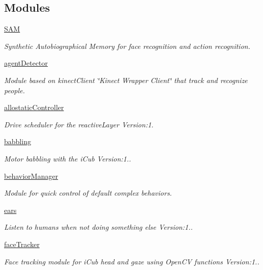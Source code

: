 \subsection*{Modules}
\begin{DoxyCompactItemize}
\item 
\hyperlink{group__icubclient__SAM__source}{S\+AM}
\begin{DoxyCompactList}\small\item\em Synthetic Autobiographical Memory for face recognition and action recognition. \end{DoxyCompactList}\item 
\hyperlink{group__agentDetector}{agent\+Detector}
\begin{DoxyCompactList}\small\item\em Module based on kinect\+Client \char`\"{}\+Kinect Wrapper Client\char`\"{} that track and recognize people. \end{DoxyCompactList}\item 
\hyperlink{group__allostaticController}{allostatic\+Controller}
\begin{DoxyCompactList}\small\item\em Drive scheduler for the reactive\+Layer Version\+:1. \end{DoxyCompactList}\item 
\hyperlink{group__babbling}{babbling}
\begin{DoxyCompactList}\small\item\em Motor babbling with the i\+Cub Version\+:1.. \end{DoxyCompactList}\item 
\hyperlink{group__behaviorManager}{behavior\+Manager}
\begin{DoxyCompactList}\small\item\em Module for quick control of default complex behaviors. \end{DoxyCompactList}\item 
\hyperlink{group__ears}{ears}
\begin{DoxyCompactList}\small\item\em Listen to humans when not doing something else Version\+:1.. \end{DoxyCompactList}\item 
\hyperlink{group__faceTracker}{face\+Tracker}
\begin{DoxyCompactList}\small\item\em Face tracking module for i\+Cub head and gaze using Open\+CV functions Version\+:1.. \end{DoxyCompactList}\item 

\end{DoxyCompactItemize}
